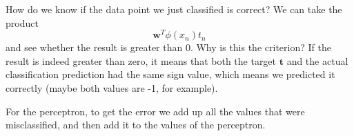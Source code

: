\documentclass{tufte-handout}
\renewcommand{\vec}[1]{\mathbf{#1}}
\begin{document}
How do we know if the data point we just classified is correct? 
We can take the product 
\[ \vec{w}^{T}\phi(x_{n})t_{n}\]
and see whether the result is greater than 0. 
Why is this the criterion?
If the result is indeed greater than zero, it means that both the target $\vec{t}$ and the actual classification
	prediction had the same sign value, which means we predicted it correctly (maybe both values are -1, for
	example).

For the perceptron, to get the error we add up all the values that were misclassified, and then add it to the 
	values of the perceptron.
\end{document}
